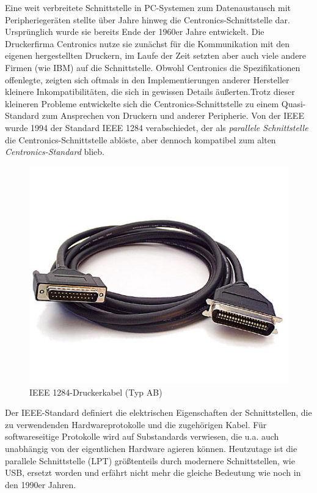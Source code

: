 \documentclass[a4paper,11pt]{article}
\begin{document}
Eine weit verbreitete Schnittstelle in PC-Systemen zum Datenaustausch mit Peripheriegeräten stellte über Jahre hinweg die Centronics-Schnittstelle dar. Ursprünglich wurde sie bereits Ende der 1960er Jahre entwickelt. Die Druckerfirma Centronics nutze sie zunächst für die Kommunikation mit den eigenen hergestellten Druckern, im Laufe der Zeit setzten aber auch viele andere Firmen (wie IBM) auf die Schnittstelle. Obwohl Centronics die Spezifikationen offenlegte, zeigten sich oftmals in den Implementierungen anderer Hersteller kleinere Inkompatibilitäten, die sich in gewissen Details äußerten.Trotz dieser kleineren Probleme entwickelte sich die Centronics-Schnittstelle zu einem Quasi-Standard zum Ansprechen von Druckern und anderer Peripherie. Von der IEEE wurde 1994 der Standard IEEE 1284 verabschiedet, der als \textit{parallele Schnittstelle} die Centronics-Schnittstelle ablöste, aber dennoch kompatibel zum alten \textit{Centronics-Standard} blieb. 
\begin{figure}[h!]
 \centering
 \includegraphics[scale=0.5]{./pics/IEEE1284Printercable_2007_04.jpg}
 \caption{IEEE 1284-Druckerkabel (Typ AB)} 	
\end{figure}
Der IEEE-Standard definiert die elektrischen Eigenschaften der Schnittstellen, die zu verwendenden Hardwareprotokolle und die zugehörigen Kabel. Für softwareseitige Protokolle wird auf Substandards verwiesen, die u.a. auch unabhängig von der eigentlichen Hardware agieren können. Heutzutage ist die parallele Schnittstelle (LPT) größtenteils durch modernere Schnittstellen, wie USB, ersetzt worden und erfährt nicht mehr die gleiche Bedeutung wie noch in den 1990er Jahren. 
\end{document}
